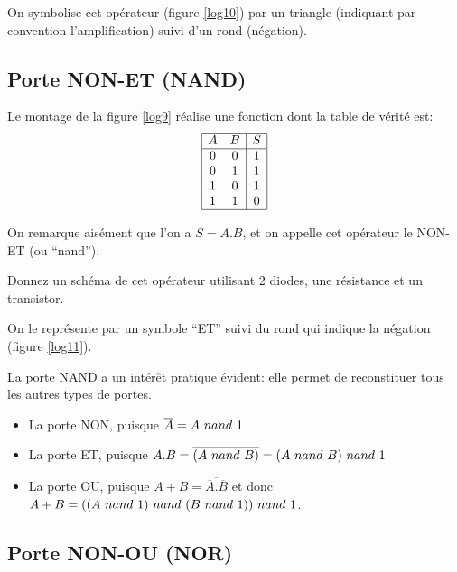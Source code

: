 On symbolise cet op\'erateur (figure \ref{log10}) par un triangle (indiquant 
par convention l'amplification) suivi d'un rond (n\'egation).
% 




\subsection{Porte NON-ET (NAND) }



Le montage de la figure \ref{log9} r\'ealise une fonction dont la table de v\'erit\'e est:
$$ \begin{array}{|cc|c|}
\hline
A & B & S\\
\hline
0 & 0 & 1 \\
0 & 1 & 1 \\
1 & 0 & 1 \\
1 & 1 & 0 \\
\hline
\end{array} $$

On remarque ais\'ement que l'on a $S = \overline{A.B}$, et on appelle
cet op\'erateur le NON-ET (ou ``nand'').

\begin{exercice}{} Donnez un sch\'ema de cet op\'erateur utilisant 2 diodes,
une r\'esistance et un transistor.
\end{exercice}

On le repr\'esente par un symbole ``ET'' suivi du rond qui indique
la n\'egation (figure \ref{log11}).


La porte NAND a un int\'er\^et pratique \'evident: elle permet de reconstituer
tous les autres types de portes.
\begin{itemize}
\item La porte NON, puisque $\overline{A}= A \ nand\  1 $
\item La porte ET, puisque $A . B = \overline{(A \ nand\  B)} =
 (A \ nand\  B) \ nand\  1$
\item La porte OU, puisque $A + B = \overline{\overline{A}.\overline{B}}$
et donc $A+B= ((A \ nand\  1) \ nand\  (B \ nand\   1)) \ nand\  1$.
\end{itemize}

\subsection{Porte NON-OU (NOR)}

